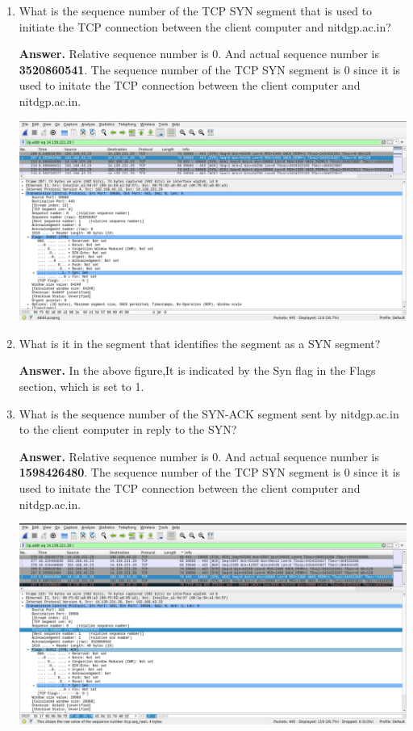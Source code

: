 \documentclass{article}
\begin{document}
\begin{enumerate}
\begin{enumerate}
\begin{lstlisting}
\end{lstlisting}
\pagebreak
\item What is the sequence number of the TCP SYN segment that is used to initiate the TCP
connection between the client computer and nitdgp.ac.in?

\textbf{Answer.} Relative sequence number is 0. And actual sequence number is \textbf{3520860541}. The sequence number	of the TCP SYN segment is 0	since it is used to initate	the	TCP	connection between the client computer and	nitdgp.ac.in.	

\includegraphics[width=700pt]{Question3D}

\item What is it in the segment that identifies the segment as a SYN segment?

\textbf{Answer.} In the above figure,It is indicated by the Syn flag in the Flags section, which is set to 1.

\item What is the sequence number of the SYN-ACK segment sent by nitdgp.ac.in to the client
computer in reply to the SYN?

\textbf{Answer.} Relative sequence number is 0. And actual sequence number is \textbf{1598426480}. The sequence number	of the TCP SYN segment is 0	since it is used to initate	the	TCP	connection between the client computer and	nitdgp.ac.in.

\includegraphics[width=700pt]{Question3F}


\end{enumerate}
\end{enumerate}
\end{document}

